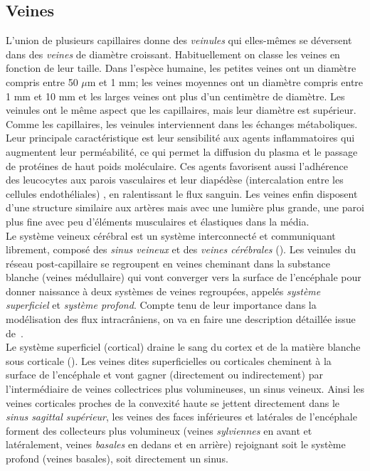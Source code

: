 \subsection{Veines}
L'union de plusieurs capillaires donne des {\em veinules} qui elles-mêmes se déversent dans des {\em veines} de diamètre croissant. Habituellement on classe les veines en fonction de leur taille. Dans l'espèce humaine, les petites veines ont un diamètre compris entre 50 $\mu$m et 1 mm; les veines moyennes ont un diamètre compris entre 1 mm et 10 mm et les larges veines ont plus d'un centimètre de diamètre. Les veinules ont le même aspect que les capillaires, mais leur diamètre est supérieur.\\
Comme les capillaires, les veinules interviennent dans les échanges métaboliques. Leur principale caractéristique est leur sensibilité aux agents inflammatoires qui augmentent leur perméabilité, ce qui permet la diffusion du plasma et le passage de protéines de haut poids moléculaire. Ces agents favorisent aussi l'adhérence des leucocytes aux parois vasculaires et leur diapédèse (intercalation entre les cellules endothéliales) , en ralentissant le flux sanguin. Les veines enfin disposent d’une structure similaire aux artères mais avec une lumière plus grande, une paroi plus fine avec peu d’éléments musculaires et élastiques dans la média.\\
Le système veineux cérébral est un système interconnecté et communiquant librement, composé des {\em sinus veineux} et des {\em veines cérébrales} (\cite{Schaller2004}). Les veinules du réseau post-capillaire se regroupent en veines cheminant dans la substance blanche (veines médullaire) qui vont converger vers la surface de l'encéphale pour donner naissance à deux systèmes de veines regroupées, appelés {\em système superficiel} et {\em système profond}. Compte tenu de leur importance dans la modélisation des flux intracr\^aniens, on va en faire une description détaillée issue de~\cite{radioanatDrainage}.\\
Le système superficiel (cortical) draine le sang du cortex et de la matière blanche sous corticale (\cite{Aydin1997}). Les veines dites superficielles ou corticales cheminent à la surface de l’encéphale et vont gagner (directement ou indirectement) par l’intermédiaire de veines collectrices plus volumineuses, un sinus veineux. Ainsi les veines corticales proches de la convexité haute se jettent directement dans le {\em sinus sagittal supérieur}, les veines des faces inférieures et latérales de l’encéphale forment des collecteurs plus volumineux (veines {\em sylviennes} en avant et latéralement, veines {\em basales} en dedans et en arrière) rejoignant soit le système profond (veines basales), soit directement un sinus.\\
